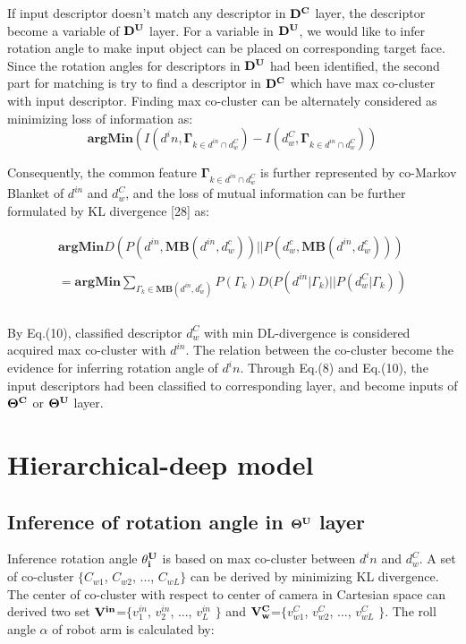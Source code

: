 \documentclass[journal]{IEEEtran}
\begin{document}
If input descriptor doesn't match any descriptor in $\bf{D^C}$ layer, the descriptor become a variable of  $\bf{D^U}$ layer. For a variable in $\bf{D^U}$, we would like to infer rotation angle to make input object can be placed on corresponding target face. Since the rotation angles for descriptors in $\bf{D^U}$ had been identified, the second part for matching is try to find a descriptor in $\bf{D^C}$ which have max co-cluster with input descriptor. Finding max co-cluster can be alternately considered as minimizing loss of information as:
\begin{equation}
\mathbf{argMin}(I(d^in , \mathbf{\Gamma}_{k \in d^{in} \cap d^C_w}) - I(d^C_w , \mathbf{\Gamma}_{k \in d^{in} \cap d^C_w}))
\end{equation}

Consequently, the common feature $\mathbf{\Gamma}_{k \in d^{in} \cap d^C_w}$ is further represented by co-Markov Blanket of $d^{in}$ and $d^C_w$, and the loss of mutual information can be further formulated by KL divergence [28] as:

\begin{equation}
\begin{array}{ll}
\mathbf{argMin}D(P(d^{in} , \mathbf{MB}(d^{in},d^c_w))||P(d^c_w , \mathbf{MB}(d^{in},d^c_w)))\\\\
= \mathbf{argMin}\sum_{\Gamma_k\in\mathbf{MB}(d^{in},d^c_w)}P(\Gamma_k)D(P(d^{in}|\Gamma_k)||P(d^C_w|\Gamma_k))\\\\
\end{array}
\end{equation}

By Eq.(10), classified descriptor $d^C_w$ with min DL-divergence is considered acquired max co-cluster with $d^{in}$. The relation between the co-cluster become the evidence for inferring rotation angle of $d^in$. Through Eq.(8) and Eq.(10), the input descriptors had been classified to corresponding layer, and become inputs of $\bf{\Theta^{C}}$ or $\bf{\Theta^{U}}$ layer.


\section{Hierarchical-deep model}
\subsection{Inference of rotation angle in $\bf{\Theta^{U}}$ layer}
Inference rotation angle $\bf{\theta^{U}_i}$ is based on max co-cluster between $d^in$ and $d^C_w$. A set of co-cluster $\{$$C_{w1}$, $C_{w2}$, ..., $C_{wL}$$\}$ can be derived by minimizing KL divergence. The center of co-cluster with respect to center of camera in Cartesian space can derived two set $\bf{V^{in}}$=$\{$$v^{in}_1$, $v^{in}_2$, ..., $v^{in}_L$ $\}$ and $\bf{V^{C}_w}$=$\{$$v^{C}_{w1}$, $v^{C}_{w2}$, ..., $v^{C}_{wL}$ $\}$. The roll angle $\alpha$ of robot arm is calculated by:
\end{document}
